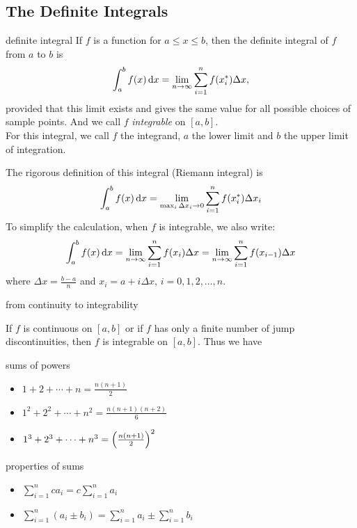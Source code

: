\documentclass[Calculus 1 Recitation.tex]{subfiles}
\begin{document}
\subsection{The Definite Integrals}
\begin{myleftlinebox}
	definite integral
	\tcblower
	If $f$ is a function for $a\leq x\leq b$, then the definite integral of $f$ from $a$ to $b$ is
	\[\int_a^b f(x)\,\mathrm{d} x = \lim_{n\to\infty} \sum_{i=1}^n f(x_i^*)\Delta x,\]
	provided that this limit exists and gives the same value for all possible choices of sample points. And we call $f$ \emph{integrable} on $[a,b]$.\\
	For this integral, we call $f$ the integrand, $a$ the lower limit and $b$ the upper limit of integration. 
	\begin{remark}
		The rigorous definition of this integral (Riemann integral) is 
		\[\int_a^b f(x)\,\mathrm{d} x = \lim_{\max_i \Delta x_i\to 0} \sum_{i=1}^n f(x_i^*)\Delta x_i\]
		To simplify the calculation, when $f$ is integrable, we also write:
		\[\int_a^b f(x)\,\mathrm{d} x =\lim_{n\to\infty} \sum_{i=1}^n f(x_i)\Delta x =\lim_{n\to\infty} \sum_{i=1}^n f(x_{i-1})\Delta x \]
		where $\Delta x=\frac{b-a}{n}$ and $x_i=a+i\Delta x$, $i=0,1,2,\dots,n$.
	\end{remark}
\end{myleftlinebox}

\begin{myleftlinebox}
	from continuity to integrability
	\tcblower
	\begin{theorem}
		If $f$ is continuous on $[a,b]$ or if $f$ has only a finite number of jump discontinuities, then $f$ is integrable on $[a,b]$. Thus we have
	\end{theorem}
\end{myleftlinebox}

\begin{myleftlinebox}
	sums of powers
	\tcblower
	\begin{itemize}
		\item $1+2+\cdots+n=\frac{n(n+1)}{2}$
		\item $1^2+2^2+\cdots+n^2 = \frac{n(n+1)(n+2)}{6}$
		\item $1^3+2^3+\cdots+n^3 = \left( \frac{n(n+1)}{2} \right)^2$
	\end{itemize}
\end{myleftlinebox}

\begin{myleftlinebox}
	properties of sums
	\tcblower
	\begin{itemize}
		\item $\sum_{i=1}^n c a_i=c\sum_{i=1}^n  a_i$
		\item $\sum_{i=1}^n (a_i\pm b_i) = \sum_{i=1}^n a_i \pm \sum_{i=1}^n b_i$
	\end{itemize}
\end{myleftlinebox}
\end{document}

